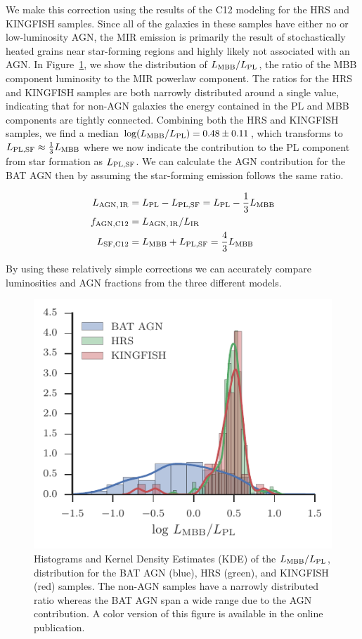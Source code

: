 \documentclass[fleqn, usenatbib]{mnras}
\begin{document}
We make this correction using the results of the C12 modeling for the HRS and KINGFISH samples. Since all of the galaxies in these samples have either no or low-luminosity AGN, the MIR emission is primarily the result of stochastically heated grains near star-forming regions and highly likely not associated with an AGN. In Figure~\ref{fig:lmbb_lpl_ratio}, we show the distribution of $L_{\rm MBB}/L_{\rm PL}$, the ratio of the MBB component luminosity to the MIR powerlaw component. The ratios for the HRS and KINGFISH samples are both narrowly distributed around a single value, indicating that for non-AGN galaxies the energy contained in the PL and MBB components are tightly connected. Combining both the HRS and KINGFISH samples, we find a median $\log(L_{\rm MBB}/L_{\rm PL})=0.48 \pm 0.11$, which transforms to $L_{\rm PL,SF} \approx \frac{1}{3}L_{\rm MBB}$ where we now indicate the contribution to the PL component from star formation as  $L_{\rm PL,SF}$. We can calculate the AGN contribution for the BAT AGN then by assuming the star-forming emission follows the same ratio.

\begin{align}
L_{\rm AGN,\,IR} &= L_{\rm PL} - L_{\rm PL, SF} = L_{\rm PL} - \frac{1}{3}L_{\rm MBB} \label{eq:c12_lagnIR} \\
f_{\rm AGN, C12} &= L_{\rm AGN, \, IR}/L_{\rm IR} \label{eq:c12_fagn} \\
L_{\rm SF, C12} &= L_{\rm MBB} + L_{\rm PL,SF} =  \frac{4}{3}L_{\rm MBB} \label{eq:c12_lsf}
\end{align}

By using these relatively simple corrections we can accurately compare luminosities and AGN fractions from the three different models.
\begin{figure}
\includegraphics[width=\columnwidth]{figures/lmbb-lpl-ratio}
\caption{Histograms and Kernel Density Estimates (KDE) of the $L_{\rm MBB}/L_{\rm PL}$, distribution for the BAT AGN (blue), HRS (green), and KINGFISH (red) samples. The non-AGN samples have a narrowly distributed ratio whereas the BAT AGN span a wide range due to the AGN contribution. A color version of this figure is available in the online publication. \label{fig:lmbb_lpl_ratio}}
\end{figure}
\end{document}
